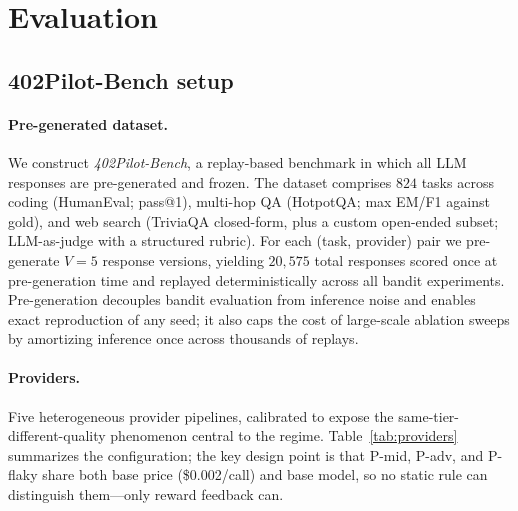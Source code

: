 \section{Evaluation}
\label{sec:eval}

\subsection{402Pilot-Bench setup}
\label{sec:eval-setup}

\paragraph{Pre-generated dataset.}
We construct \emph{402Pilot-Bench}, a replay-based benchmark in which all LLM responses are pre-generated and frozen. The dataset comprises $824$ tasks across coding (HumanEval; pass@1), multi-hop QA (HotpotQA; max EM/F1 against gold), and web search (TriviaQA closed-form, plus a custom open-ended subset; LLM-as-judge with a structured rubric). For each (task, provider) pair we pre-generate $V = 5$ response versions, yielding $20{,}575$ total responses scored once at pre-generation time and replayed deterministically across all bandit experiments. Pre-generation decouples bandit evaluation from inference noise and enables exact reproduction of any seed; it also caps the cost of large-scale ablation sweeps by amortizing inference once across thousands of replays.

\paragraph{Providers.}
Five heterogeneous provider pipelines, calibrated to expose the same-tier-different-quality phenomenon central to the regime. Table~\ref{tab:providers} summarizes the configuration; the key design point is that P-mid, P-adv, and P-flaky share both base price (\$0.002/call) and base model, so no static rule can distinguish them—only reward feedback can.

